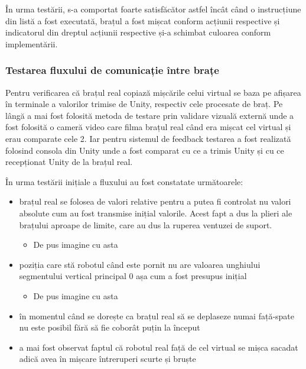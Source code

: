  În urma testării, s-a comportat foarte satisfăcător astfel încât când o instrucțiune din listă a fost executată, brațul a fost mișcat conform acțiunii respective și indicatorul din dreptul acțiunii respective și-a schimbat culoarea conform implementării. 

\subsubsection{Testarea fluxului de comunicație între brațe}
Pentru verificarea că brațul real copiază mișcările celui virtual se baza pe afișarea în terminale a valorilor trimise de Unity, respectiv cele procesate de braț. Pe lângă a mai fost folosită metoda de testare prin validare vizuală externă unde a fost folosită o cameră video care filma brațul real când era mișcat cel virtual și erau comparate cele 2. Iar pentru sistemul de feedback testarea a  fost realizată folosind consola din Unity unde a fost comparat cu ce a trimis Unity și cu ce recepționat Unity de la brațul real.

În urma testării inițiale a fluxului au fost constatate următoarele: 
\begin{itemize}
	\item brațul real se folosea de valori relative pentru a putea fi controlat nu valori absolute cum au fost transmise inițial valorile. Acest fapt a dus la plieri ale brațului aproape de limite, care au dus la ruperea ventuzei de suport.
	
	
	\begin{itemize}
		\item De pus imagine cu asta
	\end{itemize}
	
	\item poziția care stă robotul când este pornit nu are valoarea unghiului segmentului vertical principal 0 așa cum a fost presupus inițial
	
	
	\begin{itemize}
		\item De pus imagine cu asta
	\end{itemize}
	
	\item în momentul când se dorește ca brațul real să se deplaseze numai față-spate nu este posibil fără să fie coborât puțin la început
	
	\item a mai fost observat faptul că robotul real față de cel virtual se mișca sacadat adică avea în mișcare întreruperi scurte și bruște
\end{itemize}



